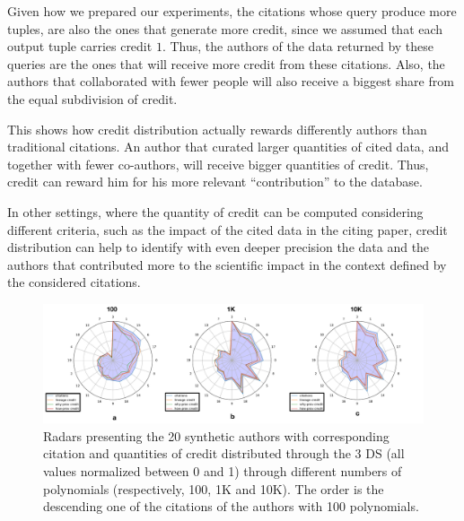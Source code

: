 Given how we prepared our experiments, the citations whose query produce more tuples, are also the ones that generate more credit, since we assumed that each output tuple carries credit $1$. Thus, the authors of the data returned by these queries are the ones that will receive more credit from these citations. Also, the authors that collaborated with fewer people will also receive a biggest share from the equal subdivision of credit. 

This shows how credit distribution actually rewards differently authors than traditional citations. An author that curated larger quantities of cited data, and together with fewer co-authors, will receive bigger quantities of credit. Thus, credit can reward him for his more relevant ``contribution'' to the database. 

In other settings, where the quantity of credit can be computed considering different criteria, such as the impact of the cited data in the citing paper, credit distribution can help to identify with even deeper precision the data and the authors that contributed more to the scientific impact in the context defined by the considered citations.





\begin{figure}[t]
\centering
  \includegraphics[width=1\textwidth]{figures/fixed_radars}
  \caption{
  Radars presenting the 20 synthetic authors with corresponding citation and quantities of credit distributed through the 3 DS (all values normalized between 0 and 1) through different numbers of polynomials (respectively, 100, 1K and 10K). 
  The order is the descending one of the citations of the authors with 100 polynomials. }
  \label{figure:3_radars}
\end{figure}

